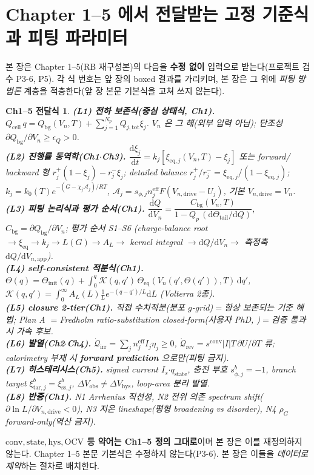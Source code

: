 \documentclass[11pt,a4paper]{article}
\newtheorem*{linkbox}{Ch1--5 전달식}
\newcommand{\dd}{\mathrm{d}}
\newcommand{\eff}{\mathrm{eff}}
\newcommand{\eq}{\mathrm{eq}}
\newcommand{\app}{\mathrm{app}}
\newcommand{\drive}{\mathrm{drive}}
\newcommand{\bg}{\mathrm{bg}}
\newcommand{\cell}{\mathrm{cell}}
\newcommand{\OCV}{\mathrm{OCV}}
\newcommand{\tot}{\mathrm{tot}}
\newcommand{\irr}{\mathrm{irr}}
\newcommand{\rev}{\mathrm{rev}}
\newcommand{\sstat}{\mathrm{ss}}
\newcommand{\conv}{\mathrm{conv}}
\newcommand{\stt}{\mathrm{state}}
\newcommand{\hys}{\mathrm{hys}}
\newcommand{\tar}{\mathrm{tar}}
\newcommand{\obs}{\mathrm{obs}}
\begin{document}
\section{Chapter 1--5 에서 전달받는 고정 기준식과 피팅 파라미터}\label{sec:ch6_inherit}
본 장은 Chapter 1--5(RB 재구성본)의 다음을 \textbf{수정 없이} 입력으로 받는다(프로젝트 검수 P3-6, P5). 각 식
번호는 앞 장의 boxed 결과를 가리키며, 본 장은 그 위에 \emph{피팅 방법론} 계층을 적층한다(앞 장 본문 기본식을
고쳐 쓰지 않는다).
\begin{linkbox}
\textbf{(L1) 전하 보존식(중심 상태식, Ch1).} $Q_\cell\,q=Q_\bg(V_n,T)+\sum_{j=1}^{N_p}Q_{j,\tot}\xi_j$. $V_n$ 은
그 해(외부 입력 아님); 단조성 $\partial Q_\bg/\partial V_n\ge\epsilon_Q>0$.\\
\textbf{(L2) 진행률 동역학(Ch1$\cdot$Ch3).} $\dfrac{\dd\xi_j}{\dd t}=k_j[\xi_{\eq,j}(V_n,T)-\xi_j]$ 또는 forward/
backward 형 $r_j^+(1-\xi_j)-r_j^-\xi_j$; detailed balance $r_j^+/r_j^-=\xi_{\eq,j}/(1-\xi_{\eq,j})$;
$k_j=k_0(T)e^{-(G-\chi_j\mathcal A_j)/RT}$, $\mathcal A_j=s_{\phi,j}n_j^{\eff}F(V_{n,\drive}-U_j)$, 기본 $V_{n,\drive}=V_n$.\\
\textbf{(L3) 피팅 논리식과 평가 순서(Ch1).} $\dfrac{\dd Q}{\dd V_n}=\dfrac{C_\bg(V_n,T)}{1-Q_p\,(\dd\Theta_\mathrm{tail}/\dd Q)}$,
$C_\bg=\partial Q_\bg/\partial V_n$; 평가 순서 S1--S6 (charge-balance root $\to\xi_{\eq}\to k_j\to L(G)\to A_L\to$
kernel integral $\to\dd Q/\dd V_n\to$ 측정축 $\dd Q/\dd V_{n,\app}$).\\
\textbf{(L4) self-consistent 적분식(Ch1).} $\Theta(q)=\Theta_\mathrm{init}(q)+\int_0^q\mathcal K(q,q')\,
\Theta_\eq(V_n(q',\Theta(q')),T)\,\dd q'$, $\mathcal K(q,q')=\int_0^\infty A_L(L)\tfrac1L e^{-(q-q')/L}\dd L$ (Volterra 2종).\\
\textbf{(L5) closure 2-tier(Ch1).} \emph{직접 수치적분}(분포 $g$-grid)$=$항상 보존되는 기준 해법; \emph{Plan A}
$=$Fredholm ratio-substitution closed-form(사용자 PhD, \cite{lee2011,son2013,jcp2017})$=$검증 통과 시 가속 후보.\\
\textbf{(L6) 발열(Ch2$\cdot$Ch4).} $\dot{\mathcal Q}_\irr=\sum_j n_j^{\eff}I_j\eta_j\ge0$, $\dot{\mathcal Q}_\rev=
s^\conv|I|T\,\partial U/\partial T$ 류; calorimetry 부재 시 \textbf{forward prediction} 으로만(피팅 금지).\\
\textbf{(L7) 히스테리시스(Ch5).} signed current $I_s$$\cdot$$q_\stt$, 충전 부호 $s_{\phi,j}^b=-1$, branch target
$\xi_{\tar,j}^b=\xi_{\sstat,j}^b$, $\Delta V_\obs\ne\Delta V_\hys$, loop-area 분리 발열.\\
\textbf{(L8) 반증(Ch1).} N1 Arrhenius 직선성, N2 전위 의존 spectrum shift($\partial\ln L/\partial V_{n,\drive}<0$),
N3 저온 lineshape(평형 broadening vs disorder), N4 $\rho_G$ forward-only(역산 금지).
\end{linkbox}
\noindent\textbf{$\conv,\stt,\hys,\OCV$ 등 약어는 Ch1--5 정의 그대로}이며 본 장은 이를 재정의하지 않는다.
Chapter 1--5 본문 기본식은 수정하지 않는다(P3-6). 본 장은 이들을 \emph{데이터로 제약}하는 절차로 배치한다.
\end{document}
